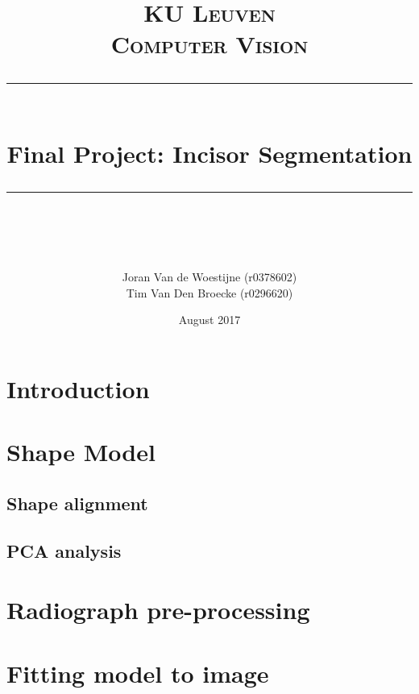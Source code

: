 \documentclass[a4paper,titlepage,12pt]{article}
\begin{document}
 
\newcommand{\horrule}[1]{\rule{\linewidth}{#1}}     %

\title{
        \normalfont \normalsize \textsc{KU Leuven} \\ [25pt]
        \normalfont \normalsize \textsc{Computer Vision} 
        \horrule{2pt} \\[0.5cm]
        \huge Final Project: Incisor Segmentation \\
        \horrule{2pt} \\[0.5cm]
}
\author{
        \normalfont            
        Joran Van de Woestijne (r0378602)\\
        Tim Van Den Broecke (r0296620)
}
\date{August 2017}
 
\maketitle

\newpage
\tableofcontents
\thispagestyle{empty}
\newpage
\setcounter{page}{1}

\section{Introduction}

\section{Shape Model}

\subsection{Shape alignment}

\subsection{PCA analysis}

\section{Radiograph pre-processing}


\section{Fitting model to image}
\end{document}
